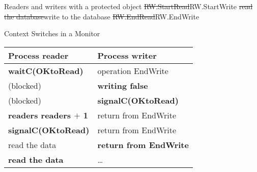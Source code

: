 \begin{wideslide}[bm=,toc=]{\large }
\vspace*{-2ex}
\begin{alg}{Readers and writers with a protected object}{}
\proc{}
\hline
{}
\st{\idt{}RW.StartRead}{\idt{}RW.StartWrite}
\st{\idt{}read the database}{\idt{}write to the database}
\st{\idt{}RW.EndRead}{\idt{}RW.EndWrite}
\end{alg}
\end{wideslide}

\begin{wideslide}[bm=,toc=]{\large Context Switches in a Monitor}
\begin{center}
\begin{paenv}
\begin{tabular}{|l|l|}\hline
Process reader & Process writer  \\\hline
\bfseries waitC(OKtoRead) & operation EndWrite \\\hline\hline
(blocked) & \bfseries writing \la{} false \\\hline
(blocked) & \bfseries signalC(OKtoRead) \\\hline\hline
\bfseries readers \la{} readers $+$ 1 & return from EndWrite \\\hline
\bfseries signalC(OKtoRead) & return from EndWrite \\\hline\hline
read the data & \bfseries return from EndWrite \\\hline\hline
\bfseries read the data & \ldots{} \\\hline
\end{tabular}
\end{paenv}
\end{center}
\end{wideslide}

